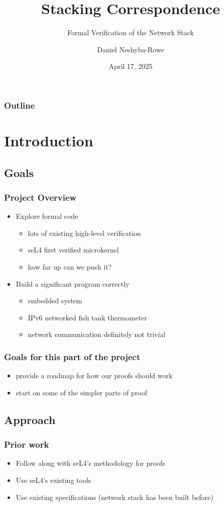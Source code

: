\documentclass{beamer}
\title{Stacking Correspondence}
\subtitle{Formal Verification of the Network Stack}
\author{Daniel Neshyba-Rowe}
\institute{Lewis \& Clark College}
\date{April 17, 2025}
\begin{document}
\begin{frame}
\titlepage
\end{frame}

\begin{frame}
\frametitle{Outline}
\tableofcontents
\end{frame}

\section{Introduction}

\subsection{Goals}
\begin{frame}
    \frametitle{Project Overview}
    \begin{itemize}
        \item Explore formal code
            \begin{itemize}
                \item lots of existing high-level verification
                \item seL4 first verified microkernel
                \item how far up can we push it?
            \end{itemize}
        \item Build a significant program correctly
            \begin{itemize}
                \item embedded system
                \item IPv6 networked fish tank thermometer
                \item network communication definitely not trivial
            \end{itemize}
    \end{itemize}
\end{frame}

\begin{frame}
    \frametitle{Goals for this part of the project}
        \begin{itemize}
            \item provide a roadmap for how our proofs should work
            \item start on some of the simpler parts of proof
        \end{itemize}
\end{frame}


\subsection{Approach}
\begin{frame}
    \frametitle{Prior work}
    \begin{itemize}
        \item Follow along with seL4's methodology for proofs
        \item Use seL4's existing tools
        \item Use existing specifications (network stack has been built before)
    \end{itemize}
\end{frame}
\end{document}
